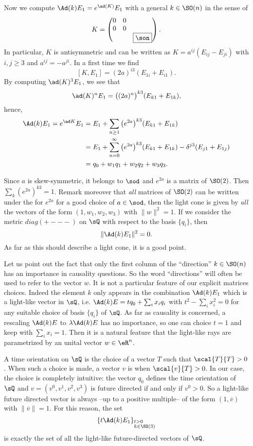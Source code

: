 Now we compute $\Ad(k)E_1=e^{\ad(K)}E_1$ with a general $k\in \SO(n)$ in the sense of
\[
K=\begin{pmatrix}
0&0\\
0&0\\
&&\fbox{$\son$}
\end{pmatrix}.
\]
In particular, $K$ is antisymmetric and can be written as $K=a^{ij}(E_{ij}-E_{ji})$ with $i,j\geq 3$ and $a^{ij}=-a^{ji}$. In a first time we find
\[
[K,E_1]=(2a)^{i3}(E_{1i}+E_{i1}).
\]
By computing $\ad(K)^3E_1$, we see that
\[
\ad(K)^nE_1=\big((2a)^n\big)^{k3}(E_{k1}+E_{1k}),
\]
hence,
\begin{equation} \label{eq:Adkeu}
\begin{split}
\Ad(k)E_1=e^{\ad K}E_1&=E_1+\sum_{n\geq 1}\big(e^{2a}\big)^{k3}(E_{k1}+E_{1k})\\
	      &=E_1+\sum_{n=0}^{\infty}\big(e^{2a}\big)^{k3}(E_{k1}+E_{1k})-\delta^{j3}(E_{j1}+E_{1j})\\
	      &=q_0+w_1q_1+w_2q_2+w_3q_3.
\end{split}
\end{equation}

Since $a$ is skew-symmetric, it belongs to $\sod$ and $e^{2a}$ is a matrix of $\SO(2)$. Then $\sum_k(e^{2a})^{k3}=1$. Remark moreover that \emph{all} matrices of $\SO(2)$ can be written under the for $e^{2a}$ for a good choice of $a\in\sod$, then the light cone is given by \emph{all} the vectors of the form $(1,w_1,w_2,w_3)$ with $\|w\|^2=1$. If we consider the metric $diag(+---)$ on $\sQ$ with respect to the basis $\{q_i\}$, then
\[
  \|\Ad(k)E_1\|^2=0.
\]
As far as this should describe a light cone, it is a good point.

Let us point out the fact that only the first column of the ``direction''{} $k\in \SO(n)$ has an importance in causality questions. So the word ``directions''{} will often be used to refer to the vector $w$. It is not a particular feature of our explicit matrices choices. Indeed the element $k$ only appears in the combination $\Ad(k)E_1$ which is a light-like vector in $\sQ$, i.e. $\Ad(k)E=tq_0+\sum_i x_iq_i$ with $t^2-\sum_i x_i^2=0$ for any suitable choice of basis $\{q_i\}$ of $\sQ$. As far as causality is concerned, a rescaling $\Ad(k)E$ to $\lambda\Ad(k)E$ has no importance, so one can choice $t=1$ and keep with $\sum_i x_i=1$. Then it is a natural feature that the light-like rays are parametrized by an unital vector $w\in\eR^n$.

A time orientation on $\sQ$ is the choice of a vector $T$ such that $\scal{T}{T}>0$. When such a choice is made, a vector $v$ is  when $\scal{v}{T}>0$. In our case, the choice is completely intuitive: the vector $q_0$ defines the time orientation of $\sQ$ and $v=(v^0,v^1,v^2,v^3)$ is future directed if and only if $v^0>0$. So a light-like future directed vector is always --up to a positive multiple-- of the form $(1,\overline{v})$ with $\|\overline{v}\|=1$. For this reason, the set 
\[
  \{t\Ad(k)E_1\}_{%
\begin{subarray}{l}
t>0\\k\in \SO(3) 
\end{subarray}
}
\]
is exactly the set of all the light-like future-directed vectors of $\sQ$.

